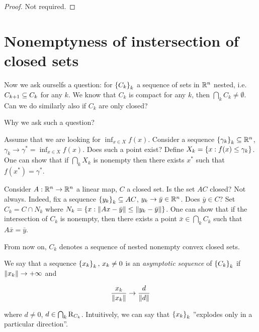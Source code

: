 \begin{proof}
    
    Not required.

\end{proof}

\section{Nonemptyness of instersection of closed sets}

Now we ask ourselfs a question: for $\left\{ C_k \right\}_k$ a sequence of sets in ${\mathbb{R}^n}$ nested, i.e. $C_{k+1} \subseteq C_k$ for any $k$. We know that $C_k$ is compact for any $k$, then $\bigcap_k C_k \neq \emptyset$. Can we do similarly also if $C_k$ are only closed?

Why we ask such a question? 

\begin{example}
    
    Assume that we are looking for $\displaystyle\inf_{x \in X} f(x)$. Consider a sequence $\left\{ \gamma_k \right\}_k \subseteq {\mathbb{R}^n}$, $\gamma_k \to \gamma^* = \inf_{x \in X} f(x)$. Does such a point exist? Define $X_k = \left\{ x : f(x) \le \gamma_k \right\}$. One can show that if $\displaystyle\bigcap_k X_k$ is nonempty then there exists $x^*$ such that $f(x^*) = \gamma^*$.

\end{example}

\begin{example}
    
    Consider $A : {\mathbb{R}^n} \to {\mathbb{R}^n}$ a linear map, $C$ a closed set. Is the set $AC$ closed? Not always. Indeed, fix a sequence $\left\{ y_k \right\}_k \subseteq AC$, $y_k \to \bar{y} \in {\mathbb{R}^n}$. Does $\bar{y} \in C$? Set $C_k = C \cap N_k$ where $N_k = \left\{ x : \lVert Ax - \bar{y} \rVert \le \lVert y_k - \bar{y} \rVert \right\}$. One can show that if the intersection of $C_k$ is nonempty, then there exists a point $\bar{x} \in \bigcap_k C_k$ such that $A\bar{x} = \bar{y}$.

\end{example}

From now on, $C_k$ denotes a sequence of nested nonempty convex closed sets.

\begin{definition}
    
    We say that a sequence $\left\{ x_k \right\}_k,\, x_k \neq 0$ is an \emph{asymptotic sequence} of $\left\{ C_k \right\}_k$ if $\lVert x_k \rVert \to +\infty$ and 

    \[ \frac{x_k}{\lVert x_k \rVert} \to \frac{d}{\lVert d \rVert} \]

    where $d \neq 0$, $d \in \bigcap_k \mathrm{R}_{C_k}$. Intuitively, we can say that $\left\{ x_k \right\}_k$ ''explodes only in a particular direction''.

\end{definition}

